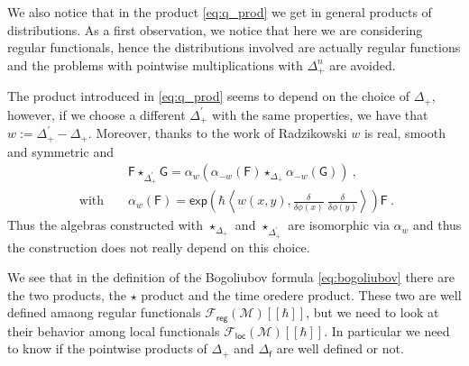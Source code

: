 \documentclass[11pt]{book}
\newcommand{\loc}{\mathsf{loc}}
\newcommand{\reg}{\mathsf{reg}}
\renewcommand{\exp}{\mathsf{exp}}
\newcommand{\sm}[1]{\left\langle#1\right\rangle}
\newcommand{\Fcal}{\mathcal{F}}
\newcommand{\Mcal}{\mathcal{M}}
\newcommand{\Fsf}{\mathsf{F}}
\newcommand{\Gsf}{\mathsf{G}}
\newcommand{\fsf}{\mathsf{f}}
\theoremstyle{break}
\begin{document}
We also notice that in the product \eqref{eq:q_prod} we get in general products of distributions. As a first observation, we notice that here we are considering regular functionals, hence the distributions involved are actually regular functions and the problems with pointwise multiplications with $\Delta_+^n$ are avoided.


The product introduced in \eqref{eq:q_prod} seems to depend on the choice of $\Delta_+$, however, if we choose a different $\Delta^\prime_+$ with the same properties, we have that $w:=\Delta^\prime_+ - \Delta_+$. Moreover, thanks to the work of Radzikowski \cite{radzikowski_micro-local_1996} $w$ is real, smooth and symmetric and
%
\begin{eqnarray}
&& \Fsf \star_{\Delta^\prime_+} \Gsf = \alpha_w \left(\alpha_{-w}(\Fsf) \star_{\Delta_+} \alpha_{-w}(\Gsf)\right) \ , \nonumber \\[6pt]
\mbox{ with } && \alpha_{w}(\Fsf) = \exp\left(\hbar \sm{ w(x,y) , \frac{\delta}{\delta\phi(x)} \ \frac{\delta}{\delta\phi(y)} } \right) \Fsf \ .
\label{eq:alpha_isomorph}
\end{eqnarray}
%
Thus the algebras constructed with $\star_{\Delta_+}$ and $\star_{\Delta^\prime_+}$ are isomorphic via $\alpha_{w}$ and thus the construction does not really depend on this choice. 



\bigskip

We see that in the definition of the Bogoliubov formula \eqref{eq:bogoliubov} there are the two products, the $\star$ product and the time oredere product. These two are well defined amaong regular functionals $\Fcal_\reg(\Mcal)[[\hbar]]$, but we need to look at their behavior among local functionals $\Fcal_\loc(\Mcal)[[\hbar]]$. In particular we need to know if the pointwise products of $\Delta_+$ and $\Delta_\fsf$ are well defined or not.
\end{document}
